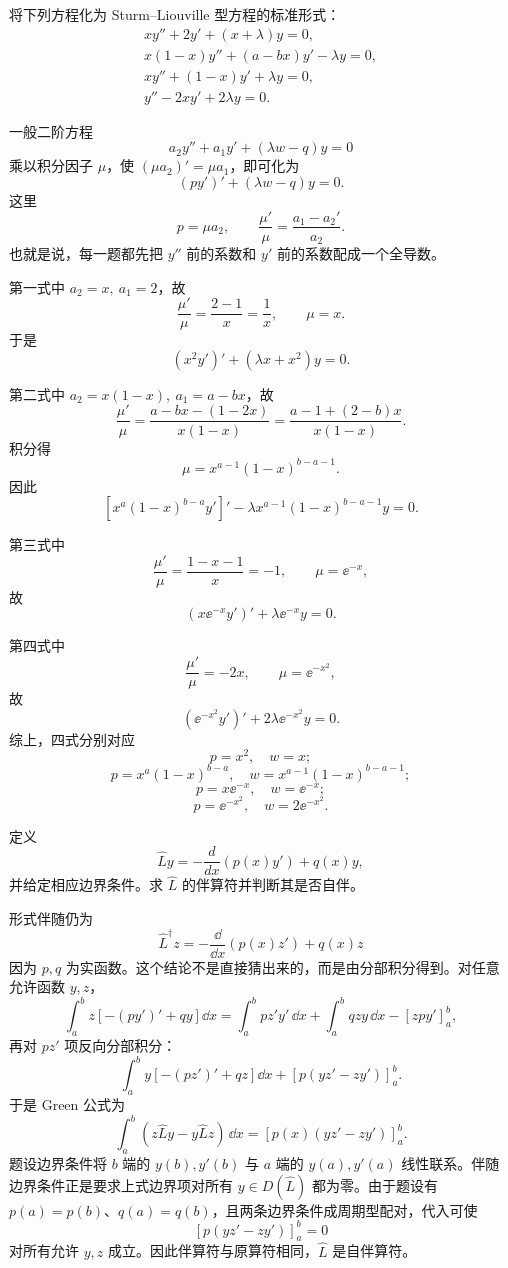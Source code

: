 ﻿


\begin{question}
将下列方程化为 Sturm--Liouville 型方程的标准形式：
\[
\begin{gathered}
xy''+2y'+(x+\lambda)y=0,\\
x(1-x)y''+(a-bx)y'-\lambda y=0,\\
xy''+(1-x)y'+\lambda y=0,\\
y''-2xy'+2\lambda y=0.
\end{gathered}
\]
\begin{solution}
一般二阶方程
\[
a_2y''+a_1y'+(\lambda w-q)y=0
\]
乘以积分因子 \(\mu\)，使 \((\mu a_2)'=\mu a_1\)，即可化为
\[
(py')'+(\lambda w-q)y=0.
\]
这里
\[
p=\mu a_2,\qquad
\frac{\mu'}{\mu}=\frac{a_1-a_2'}{a_2}.
\]
也就是说，每一题都先把 \(y''\) 前的系数和 \(y'\) 前的系数配成一个全导数。

第一式中 \(a_2=x,\ a_1=2\)，故
\[
\frac{\mu'}{\mu}=\frac{2-1}{x}=\frac1x,\qquad \mu=x.
\]
于是
\[
(x^2y')'+(\lambda x+x^2)y=0.
\]

第二式中 \(a_2=x(1-x),\ a_1=a-bx\)，故
\[
\frac{\mu'}{\mu}
=\frac{a-bx-(1-2x)}{x(1-x)}
=\frac{a-1+(2-b)x}{x(1-x)}.
\]
积分得
\[
\mu=x^{a-1}(1-x)^{b-a-1}.
\]
因此
\[
\left[x^a(1-x)^{b-a}y'\right]'
-\lambda x^{a-1}(1-x)^{b-a-1}y=0.
\]

第三式中
\[
\frac{\mu'}{\mu}=\frac{1-x-1}{x}=-1,\qquad \mu=\ee^{-x},
\]
故
\[
(x\ee^{-x}y')'+\lambda \ee^{-x}y=0.
\]

第四式中
\[
\frac{\mu'}{\mu}=-2x,\qquad \mu=\ee^{-x^2},
\]
故
\[
(\ee^{-x^2}y')'+2\lambda \ee^{-x^2}y=0.
\]
综上，四式分别对应
\[
p=x^2,\quad w=x;
\]
\[
p=x^a(1-x)^{b-a},\quad w=x^{a-1}(1-x)^{b-a-1};
\]
\[
p=x\ee^{-x},\quad w=\ee^{-x};
\]
\[
p=\ee^{-x^2},\quad w=2\ee^{-x^2}.
\]
\end{solution}
\end{question}

\begin{question}
定义
\[
\hat Ly=-\frac d{dx}\left(p(x)y'\right)+q(x)y,
\]
并给定相应边界条件。求 \(\hat L\) 的伴算符并判断其是否自伴。
\begin{solution}
形式伴随仍为
\[
\hat L^\dagger z=-\frac{\dd}{\dd{x}}\left(p(x)z'\right)+q(x)z
\]
因为 \(p,q\) 为实函数。这个结论不是直接猜出来的，而是由分部积分得到。对任意允许函数 \(y,z\)，
\[
\int_a^b z\left[-(py')'+qy\right]\dd{x}
=\int_a^b pz'y'\,\dd{x}+\int_a^b qzy\,\dd{x}-\left[zpy'\right]_a^b,
\]
再对 \(pz'\) 项反向分部积分：
\[
\int_a^b y\left[-(pz')'+qz\right]\dd{x}
+\left[p(yz'-zy')\right]_a^b.
\]
于是 Green 公式为
\[
\int_a^b(z\hat Ly-y\hat Lz)\,\dd{x}
=\left[p(x)(yz'-zy')\right]_a^b.
\]
题设边界条件将 \(b\) 端的 \(y(b),y'(b)\) 与 \(a\) 端的 \(y(a),y'(a)\) 线性联系。伴随边界条件正是要求上式边界项对所有 \(y\in D(\hat L)\) 都为零。由于题设有 \(p(a)=p(b)\)、\(q(a)=q(b)\)，且两条边界条件成周期型配对，代入可使
\[
\left[p(yz'-zy')\right]_a^b=0
\]
对所有允许 \(y,z\) 成立。因此伴算符与原算符相同，\(\hat L\) 是自伴算符。
\end{solution}
\end{question}

